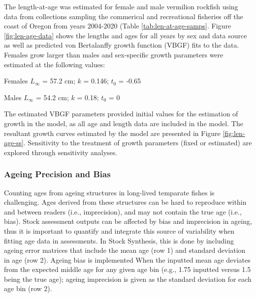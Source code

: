 \documentclass[11pt,
  english,
  a4paper,
]{article}
\begin{document}
The length-at-age was estimated for female and male vermilion rockfish using data from collections sampling the commerical and recreational fisheries off the coast of Oregon from years 2004-2020 (Table \ref{tab:len-at-age-samps}. Figure \ref{fig:len-age-data} shows the lengths and ages for all years by sex and data source as well as predicted von Bertalanffy growth function (VBGF) fits to the data. Females grow larger than males and sex-specific growth parameters were estimated at the following values:

\leavevmode\tagmcend\tagstructend\par

\begin{centering}

Females $L_{\infty}$ = 57.2 cm; $k$ = 0.146; $t_0$ = -0.65

Males $L_{\infty}$ = 54.2 cm; $k$ = 0.18; $t_0$ = 0

\end{centering}

\vspace{0.5cm}


The estimated VBGF parameters provided initial values for the estimation of growth in the model, as all age and length data are included in the model. The resultant growth curves estimated by the model are presented in Figure \ref{fig:len-age-ss}. Sensitivity to the treatment of growth parameters (fixed or estimated) are explored through sensitivity analyses.

\leavevmode\tagmcend\tagstructend\par


\hypertarget{ageing-precision-and-bias}{%
\subsubsection{Ageing Precision and Bias}\label{ageing-precision-and-bias}}

\leavevmode\tagmcend\tagstructend


Counting ages from ageing structures in long-lived temparate fishes is challenging. Ages derived from these structures can be hard to reproduce within and between readers (i.e., imprecision), and may not contain the true age (i.e., bias). Stock assessment outputs can be affected by bias and imprecision in ageing, thus it is important to quantify and integrate this source of variability when fitting age data in assessments. In Stock Synthesis, this is done by including ageing error matrices that include the mean age (row 1) and standard deviation in age (row 2). Ageing bias is implemented When the inputted mean age deviates from the expected middle age for any given age bin (e.g., 1.75 inputted versus 1.5 being the true age); ageing imprecision is given as the standard deviation for each age bin (row 2).
\end{document}
